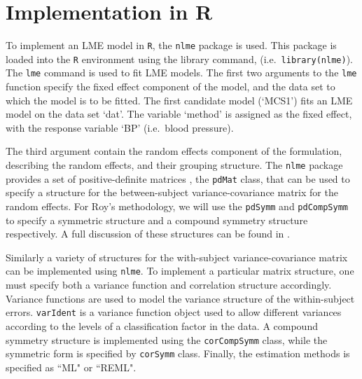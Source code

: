 \documentclass[12pt, a4paper]{report}
\theoremstyle{plain}
\theoremstyle{definition}
\theoremstyle{remark}
\begin{document}


\section{Implementation in R}
To implement an LME model in \texttt{R}, the \texttt{nlme} package is used. This package is loaded into the \texttt{R} environment using the library command, (i.e.\ \texttt{library(nlme)}). The \texttt{lme} command is used to fit LME models. The first two arguments to the \texttt{lme} function specify the fixed effect component of the model, and the data set to which the model is to be fitted. The first candidate model (`MCS1') fits an LME model on the data set `dat'. The variable `method' is assigned as the fixed effect, with the response variable `BP' (i.e.\ blood pressure).

The third argument contain the random effects component of the formulation, describing the random effects, and their grouping structure. The \texttt{nlme} package provides a set of positive-definite matrices , the \texttt{pdMat} class, that can be used to specify a structure for the between-subject variance-covariance matrix for the random effects. For Roy's methodology, we will use the \texttt{pdSymm} and \texttt{pdCompSymm} to specify a symmetric structure and a compound symmetry structure respectively. A full discussion of these structures can be found in \citet[pg. 158]{PB}.

Similarly a variety of structures for the with-subject variance-covariance matrix can be implemented using \texttt{nlme}. To implement a particular matrix structure, one must specify both a variance function and correlation structure accordingly. Variance functions are used to model the variance structure of the within-subject errors. \texttt{varIdent} is a variance function object used to allow different variances according to the levels of a classification factor in the data. A compound symmetry structure is implemented using the \texttt{corCompSymm} class, while the symmetric form is specified by \texttt{corSymm} class. Finally, the estimation methods is specified as ``ML" or ``REML".
\end{document}
